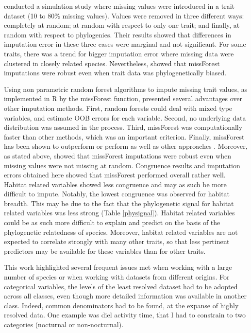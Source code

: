 \citet{Penone2014} conducted a simulation study where missing values were introduced in a trait dataset (10 to 80\% missing values). Values were removed in three different ways: completely at random; at random with respect to only one trait; and finally, at random with respect to phylogenies. Their results showed that differences in imputation error in these three cases were marginal and not significant. For some traits, there was a trend for bigger imputation error where missing data were clustered in closely related species.  Nevertheless, \citet{Penone2014} showed that missForest imputations were robust even when trait data was phylogenetically biased.  

Using non parametric random forest algorithms to impute missing trait values, as implemented in R by the missForest function, presented several advantages over other imputation methods. First, random forests could deal with mixed type variables, and estimate OOB errors for each variable. Second, no underlying data distribution was assumed in the process. Third, missForest was computationally faster than other methods, which was an important criterion. Finally, missForest has been shown to outperform or perform as well as other approaches \citep{Stekhoven2012, Penone2014}. Moreover, as stated above, \citet{Penone2014} showed that missForest imputations were robust even when  missing values were not missing at random. Congruence results and imputation errors obtained here showed that missForest performed overall rather well. Habitat related variables showed less congruence and may as such be more difficult to impute. Notably, the lowest congruence was observed for habitat breadth. This may be due to the fact that the phylogenetic signal for habitat related variables was less strong (Table \ref{physignal}). Habitat related variables could be as such more difficult to explain and predict on the basis of the phylogenetic relatedness of species. Moreover, habitat related variables are not expected to correlate strongly with many other traits, so that less pertinent predictors may be available for these variables than for other traits.

This work highlighted several frequent issues met when working with a large number of species or when working with datasets from different origins. For categorical variables, the levels of the least resolved dataset had to be adopted across all classes, even though more detailed information was available in another class. Indeed, common denominators had to be found, at the expanse of highly resolved data. One example was diel activity time, that I had to constrain to two categories (nocturnal or non-nocturnal).

